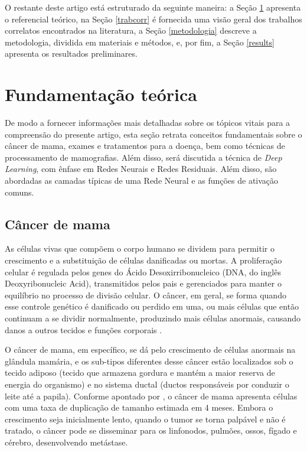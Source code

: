 O restante deste artigo está estruturado da seguinte maneira: a Seção \ref{fundteorica} apresenta o referencial teórico, na Seção \ref{trabcorr} é fornecida uma visão geral dos trabalhos correlatos encontrados na literatura, a Seção \ref{metodologia} descreve a metodologia, dividida em materiais e métodos, e, por fim, a Seção \ref{results} apresenta os resultados preliminares. 




\section{\esp Fundamentação teórica}  \label{fundteorica}

De modo a fornecer informações mais detalhadas sobre os tópicos vitais para a compreensão do presente artigo, esta seção retrata conceitos fundamentais sobre o câncer de mama, exames e tratamentos para a doença, bem como técnicas de processamento de mamografias. Além disso, será discutida a técnica de \textit{Deep Learning}, com ênfase em Redes Neurais e Redes Residuais. Além disso, são abordadas as camadas típicas de uma Rede Neural e as funções de ativação comuns.


\subsection{\esp Câncer de mama} \label{cancerdemama}
As células vivas que compõem o corpo humano se dividem para permitir o crescimento e a substituição de células danificadas ou mortas. A proliferação celular é regulada pelos genes do Ácido Desoxirribonucleico (DNA, do inglês Deoxyribonucleic Acid), transmitidos pelos pais e gerenciados para manter o equilíbrio no processo de divisão celular. O câncer, em geral, se forma quando esse controle genético é danificado ou perdido em uma, ou mais células que então continuam a se dividir normalmente, produzindo mais células anormais, causando danos a outros tecidos e funções corporais \cite{basicOncology}.

O câncer de mama, em específico, se dá pelo crescimento de células anormais na glândula mamária, e os sub-tipos diferentes desse câncer estão localizados sob o tecido adiposo (tecido que armazena gordura e mantém a maior reserva de energia do organismo) e no sistema ductal (ductos responsáveis por conduzir o leite até a papila). Conforme apontado por , o câncer de mama apresenta células com uma taxa de duplicação de tamanho estimada em 4 meses. Embora o crescimento seja inicialmente lento, quando o tumor se torna palpável e não é tratado, o câncer pode se disseminar para os linfonodos, pulmões, ossos, fígado e cérebro, desenvolvendo metástase.

